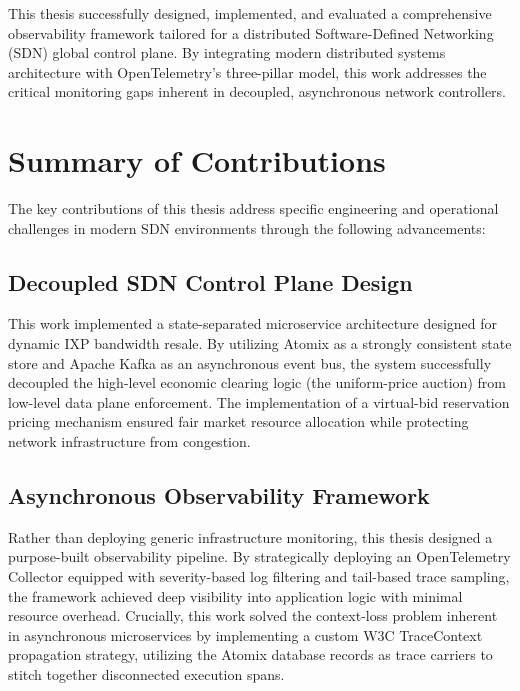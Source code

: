 
\begin{conclusion}

This thesis successfully designed, implemented, and evaluated a comprehensive observability framework tailored for a distributed Software-Defined Networking (SDN) global control plane. By integrating modern distributed systems architecture with OpenTelemetry's three-pillar model, this work addresses the critical monitoring gaps inherent in decoupled, asynchronous network controllers.

\section{Summary of Contributions}

The key contributions of this thesis address specific engineering and operational challenges in modern SDN environments through the following advancements:

\subsection{Decoupled SDN Control Plane Design}
This work implemented a state-separated microservice architecture designed for dynamic IXP bandwidth resale. By utilizing Atomix as a strongly consistent state store and Apache Kafka as an asynchronous event bus, the system successfully decoupled the high-level economic clearing logic (the uniform-price auction) from low-level data plane enforcement. The implementation of a virtual-bid reservation pricing mechanism ensured fair market resource allocation while protecting network infrastructure from congestion.

\subsection{Asynchronous Observability Framework}
Rather than deploying generic infrastructure monitoring, this thesis designed a purpose-built observability pipeline. By strategically deploying an OpenTelemetry Collector equipped with severity-based log filtering and tail-based trace sampling, the framework achieved deep visibility into application logic with minimal resource overhead. Crucially, this work solved the context-loss problem inherent in asynchronous microservices by implementing a custom W3C TraceContext propagation strategy, utilizing the Atomix database records as trace carriers to stitch together disconnected execution spans.


\end{conclusion}
